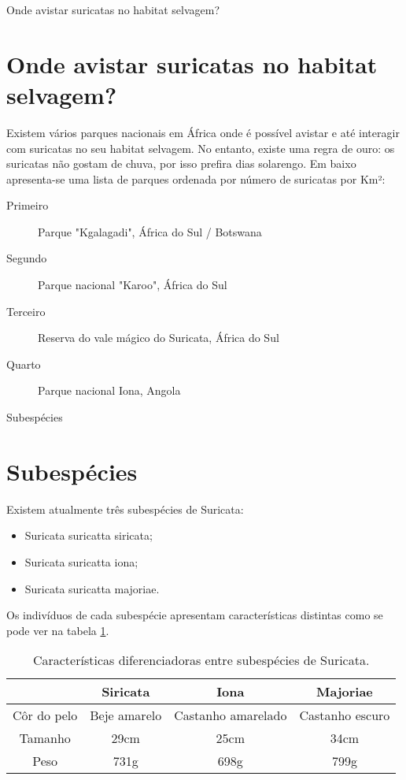 \documentclass[a4paper,11pt]{beamer}
\begin{document}
\begin{frame}{Onde avistar suricatas no habitat selvagem?}
\section{Onde avistar suricatas no habitat selvagem?}
Existem vários parques nacionais em África onde é possível avistar e até interagir com suricatas no seu habitat selvagem. No entanto, existe uma regra de ouro: os suricatas não gostam de chuva, por isso prefira dias solarengo. Em baixo apresenta-se uma lista de parques ordenada por número de suricatas por Km²: %
\begin{description}
\item[Primeiro] Parque "Kgalagadi", África do Sul / Botswana
\item[Segundo] Parque nacional "Karoo", África do Sul
\item[Terceiro] Reserva do vale mágico do Suricata, África do Sul
\item[Quarto] Parque nacional Iona, Angola
\end{description}
\end{frame}
\begin{frame}{Subespécies}
\section{Subespécies}
Existem atualmente três subespécies de Suricata:
\begin{itemize}
\item Suricata suricatta siricata;
\item Suricata suricatta iona;
\item Suricata suricatta majoriae.
\end{itemize}
Os indivíduos de cada subespécie apresentam características distintas como se pode ver na tabela \ref{ss}.
\begin{table}
\centering
\begin{tabular}{c|c|c|c|}
\cline{2-4}
 & \textbf{Siricata} & \textbf{Iona} & \textbf{Majoriae} \\ \hline
\multicolumn{1}{|c|}{Côr do pelo} & Beje amarelo &  Castanho amarelado & Castanho escuro \\ \hline
\multicolumn{1}{|c|}{Tamanho} & 29cm & 25cm & 34cm \\ \hline
\multicolumn{1}{|c|}{Peso} & 731g & 698g & 799g \\ \hline
\end{tabular}
\caption{Características diferenciadoras entre subespécies de Suricata.}
\label{ss}
\end{table}
\end{frame}
\end{document}
